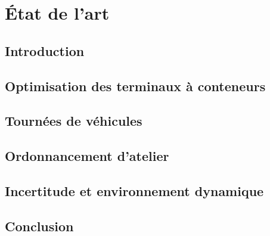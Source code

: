 

\chapter{État de l'art}    \label{art}


\section*{Introduction}

\section{Optimisation des terminaux à conteneurs}
\section{Tournées de véhicules}
\section{Ordonnancement d'atelier}
\section{Incertitude et environnement dynamique}

\section*{Conclusion}



